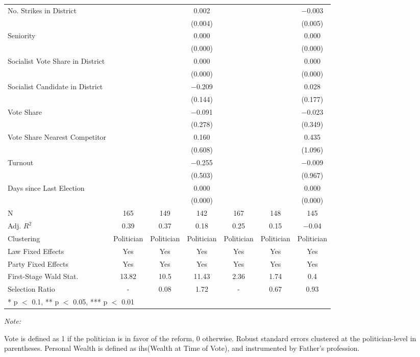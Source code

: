 \begin{table}[!h]
{\begin{threeparttable}
\begin{tabular}[t]{lcccccc}
No. Strikes in District &  &  & \num{0.002} &  &  & \num{-0.003}\\
 &  &  & (\num{0.004}) &  &  & (\num{0.005})\\
Seniority &  &  & \num{0.000} &  &  & \num{0.000}\\
 &  &  & (\num{0.000}) &  &  & \vphantom{2} (\num{0.000})\\
Socialist Vote Share in District &  &  & \num{0.000} &  &  & \num{0.000}\\
 &  &  & (\num{0.000}) &  &  & \vphantom{1} (\num{0.000})\\
Socialist Candidate in District &  &  & \num{-0.209} &  &  & \num{0.028}\\
 &  &  & (\num{0.144}) &  &  & (\num{0.177})\\
Vote Share &  &  & \num{-0.091} &  &  & \num{-0.023}\\
 &  &  & (\num{0.278}) &  &  & (\num{0.349})\\
Vote Share Nearest Competitor &  &  & \num{0.160} &  &  & \num{0.435}\\
 &  &  & (\num{0.608}) &  &  & (\num{1.096})\\
Turnout &  &  & \num{-0.255} &  &  & \num{-0.009}\\
 &  &  & (\num{0.503}) &  &  & (\num{0.967})\\
Days since Last Election &  &  & \num{0.000} &  &  & \num{0.000}\\
 &  &  & (\num{0.000}) &  &  & (\num{0.000})\\
\midrule
N & \num{165} & \num{149} & \num{142} & \num{167} & \num{148} & \num{145}\\
Adj. $R^2$ & \num{0.39} & \num{0.37} & \num{0.18} & \num{0.25} & \num{0.15} & \num{-0.04}\\
Clustering & Politician & Politician & Politician & Politician & Politician & Politician\\
Law Fixed Effects & Yes & Yes & Yes & Yes & Yes & Yes\\
Party Fixed Effects & Yes & Yes & Yes & Yes & Yes & Yes\\
First-Stage Wald Stat. & 13.82 & 10.5 & 11.43 & 2.36 & 1.74 & 0.4\\
Selection Ratio & - & 0.08 & 1.72 & - & 0.67 & 0.93\\
\bottomrule
\multicolumn{7}{l}{\rule{0pt}{1em}* p $<$ 0.1, ** p $<$ 0.05, *** p $<$ 0.01}\\
\end{tabular}
\begin{tablenotes}[para]
\item \textit{Note: } 
\item Vote is defined as 1 if the politician is in favor of the reform, 0 otherwise. Robust standard errors clustered at the politician-level in parentheses. Personal Wealth is defined as ihs(Wealth at Time of Vote), and instrumented by Father's profession.
\end{tablenotes}
\end{threeparttable}}
\end{table}
